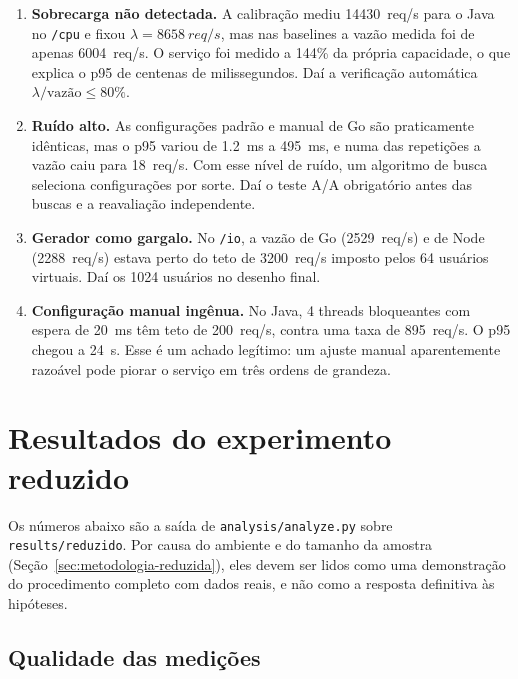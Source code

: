 \documentclass[11pt,a4paper]{article}
\begin{document}
\begin{enumerate}
  \item \textbf{Sobrecarga não detectada.} A calibração mediu \SI{14430}{req/s} para o Java no \texttt{/cpu} e fixou
    $\lambda = \SI{8658}{req/s}$, mas nas baselines a vazão medida foi de apenas \SI{6004}{req/s}. O serviço foi
    medido a 144\% da própria capacidade, o que explica o p95 de centenas de milissegundos. Daí a verificação
    automática $\lambda / \text{vazão} \le 80\%$.
  \item \textbf{Ruído alto.} As configurações padrão e manual de Go são praticamente idênticas, mas o p95 variou de
    \SI{1,2}{ms} a \SI{495}{ms}, e numa das repetições a vazão caiu para \SI{18}{req/s}. Com esse nível de ruído, um
    algoritmo de busca seleciona configurações por sorte. Daí o teste A/A obrigatório antes das buscas e a reavaliação independente.
  \item \textbf{Gerador como gargalo.} No \texttt{/io}, a vazão de Go (\SI{2529}{req/s}) e de Node (\SI{2288}{req/s}) estava
    perto do teto de \SI{3200}{req/s} imposto pelos 64 usuários virtuais. Daí os 1024 usuários no desenho final.
  \item \textbf{Configuração manual ingênua.} No Java, 4 threads bloqueantes com espera de \SI{20}{ms} têm teto de
    \SI{200}{req/s}, contra uma taxa de \SI{895}{req/s}. O p95 chegou a \SI{24}{s}. Esse é um achado legítimo: um
    ajuste manual aparentemente razoável pode piorar o serviço em três ordens de grandeza.
\end{enumerate}

\section{Resultados do experimento reduzido}
\label{sec:resultados}

Os números abaixo são a saída de \texttt{analysis/analyze.py} sobre \texttt{results/reduzido}. Por causa do ambiente
e do tamanho da amostra (Seção~\ref{sec:metodologia-reduzida}), eles devem ser lidos como uma demonstração do
procedimento completo com dados reais, e não como a resposta definitiva às hipóteses.

\subsection{Qualidade das medições}
\end{document}
